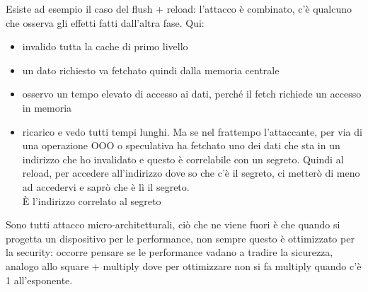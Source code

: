 \documentclass[oneside, 12pt]{extbook}
\begin{document}
Esiste ad esempio il caso del flush + reload: l'attacco è combinato, c'è qualcuno che osserva gli effetti fatti dall'altra fase. Qui:
\begin{itemize}
	\item invalido tutta la cache di primo livello
	\item un dato richiesto va fetchato quindi dalla memoria centrale
	\item osservo un tempo elevato di accesso ai dati, perché il fetch richiede un accesso in memoria
	\item ricarico e vedo tutti tempi lunghi. Ma se nel frattempo l'attaccante, per via di una operazione OOO o speculativa ha fetchato uno dei dati che sta in un indirizzo che ho invalidato e questo è correlabile con un segreto. Quindi al reload, per accedere all'indirizzo dove so che c'è il segreto, ci metterò di meno ad accedervi e saprò che è lì il segreto.
	\\È l'indirizzo correlato al segreto
\end{itemize}
Sono tutti attacco micro-architetturali, ciò che ne viene fuori è che quando si progetta un dispositivo per le performance, non sempre questo è ottimizzato per la security: occorre pensare se le performance vadano a tradire la sicurezza, analogo allo square + multiply dove per ottimizzare non si fa multiply quando c'è 1 all'esponente.
\end{document}
